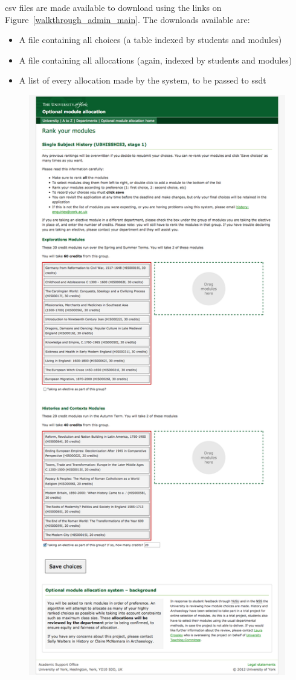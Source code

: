 \Gls{csv} files are made available to download using the links on
Figure~\ref{walkthrough_admin_main}. The downloads available are:

\begin{itemize}
  \item A file containing all choices (a table indexed by students and modules)
  \item A file containing all allocations (again, indexed by students and modules)
  \item A list of every allocation made by the system, to be passed to \gls{ssdt}
\end{itemize}

\begin{landscape}
  \begin{figure}
    \begin{minipage}{0.49\linewidth}
      \centering
      \includegraphics[width=0.6\linewidth]{images/walkthrough/student_rank_modules.png}

\end{minipage}
\end{figure}
\end{landscape}
